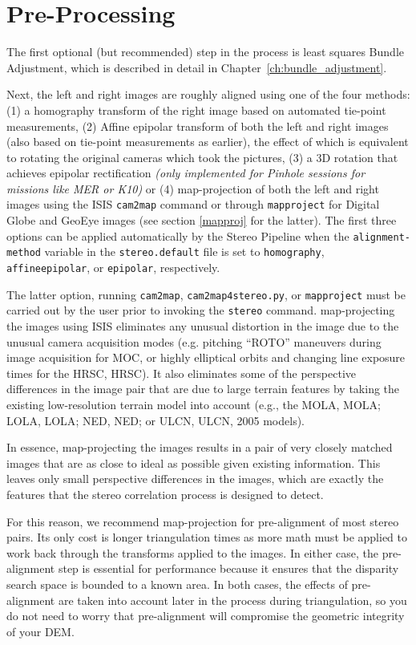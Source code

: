 \section{Pre-Processing}

The first optional (but recommended) step in the process is least
squares Bundle Adjustment, which is described in detail in
Chapter~\ref{ch:bundle_adjustment}.

Next, the left and right images are roughly aligned using one of the four
methods: (1) a homography transform of the right image based on
automated tie-point measurements, (2) Affine epipolar transform of both
the left and right images (also based on tie-point measurements as earlier),
the effect of which is equivalent to rotating
the original cameras which took the pictures, (3) a 3D rotation that achieves
epipolar rectification {\it(only implemented for Pinhole sessions for
  missions like MER or K10)} or (4) map-projection of both the left
and right images using the \ac{ISIS} \texttt{cam2map} command or
through \texttt{mapproject} for Digital Globe and GeoEye images (see
section \ref{mapproj} for the latter).
The first three options can be applied automatically by the Stereo
Pipeline when the \texttt{alignment-method} variable in the
\texttt{stereo.default} file is set to \texttt{homography}, 
\texttt{affineepipolar}, or \texttt{epipolar}, respectively.

The latter option, running {\tt cam2map}, {\tt cam2map4stereo.py}, or
{\tt mapproject} must be carried out by the user prior to
invoking the {\tt stereo} command.  map-projecting the images using
\ac{ISIS} eliminates any unusual distortion in the image due to the
unusual camera acquisition modes (e.g. pitching ``ROTO'' maneuvers
during image acquisition for \ac{MOC}, or highly elliptical orbits and
changing line exposure times for the \acl{HRSC}, \acs{HRSC}).  It also
eliminates some of the perspective differences in the image pair that
are due to large terrain features by taking the existing low-resolution
terrain model into account (e.g., the \acl{MOLA}, \acs{MOLA};
\acl{LOLA}, \acs{LOLA}; \acl {NED}, \acs {NED}; or \acl{ULCN},
\acs{ULCN}, 2005 models).

In essence, map-projecting the images results in a pair of very
closely matched images that are as close to ideal as possible given
existing information. This leaves only small perspective differences
in the images, which are exactly the features that the stereo
correlation process is designed to detect.

For this reason, we recommend map-projection for pre-alignment of most
stereo pairs. Its only cost is longer triangulation times as more math
must be applied to work back through the transforms applied to the images. In
either case, the pre-alignment step is essential for performance
because it ensures that the disparity search space is bounded to a
known area.  In both cases, the effects of pre-alignment are taken
into account later in the process during triangulation, so you do not
need to worry that pre-alignment will compromise the geometric
integrity of your \ac{DEM}.

